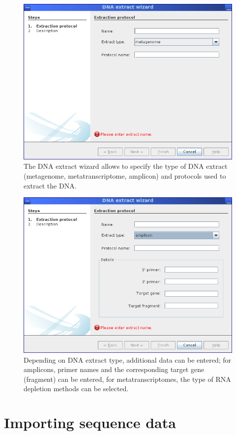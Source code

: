 \begin{figure}[H]
\centering
\includegraphics[width=.8\textwidth]{img/mgx/extractwiz1}
\caption[DNA extract wizard]{The DNA extract wizard allows to specify the type of DNA extract (metagenome, 
metatranscriptome, amplicon) and protocols used to extract the DNA.}
\label{extractwiz1}
\end{figure}

\begin{figure}[H]
\centering
\includegraphics[width=.8\textwidth]{img/mgx/extractwiz2}
\caption[DNA extract wizard]{Depending on DNA extract type, additional data can be entered; for amplicons, primer
names and the corresponding target gene (fragment) can be entered, for metatranscriptomes, the type of RNA depletion
methods can be selected.}
\label{extractwiz2}
\end{figure}

\section{Importing sequence data}

